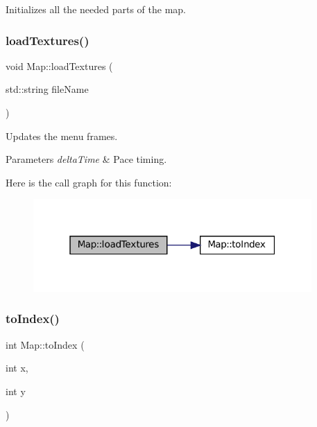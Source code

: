 Initializes all the needed parts of the map. 

\mbox{\label{classMap_a63ecd67d43e63befe38de3e438abedff}} 
\subsubsection{\texorpdfstring{load\+Textures()}{loadTextures()}}
{\footnotesize\ttfamily void Map\+::load\+Textures (\begin{DoxyParamCaption}\item[{std\+::string}]{file\+Name }\end{DoxyParamCaption})}



Updates the menu frames. 


\begin{DoxyParams}{Parameters}
{\em delta\+Time} & Pace timing. \\
\hline
\end{DoxyParams}
Here is the call graph for this function\+:\nopagebreak
\begin{figure}[H]
\begin{center}
\leavevmode
\includegraphics[width=301pt]{classMap_a63ecd67d43e63befe38de3e438abedff_cgraph}
\end{center}
\end{figure}
\mbox{\label{classMap_a378ff701ba69cfe800693466f8f3299e}} 
\subsubsection{\texorpdfstring{to\+Index()}{toIndex()}\hspace{0.1cm}{\footnotesize\ttfamily [1/2]}}
{\footnotesize\ttfamily int Map\+::to\+Index (\begin{DoxyParamCaption}\item[{int}]{x,  }\item[{int}]{y }\end{DoxyParamCaption})}



